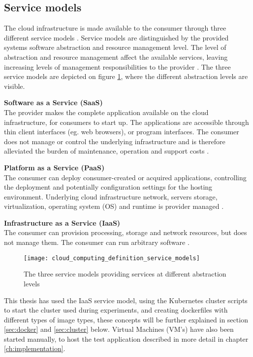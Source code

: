 \subsection{Service models}
The cloud infrastructure is made available to the consumer through three different service models \cite{mell2011nist}. Service models are distinguished by the provided systems software abstraction and resource management level. The level of abstraction and resource management affect the available services, leaving increasing levels of management responsibilities to the provider \cite[p. 52]{armbrust2010view}.
The three service models are depicted on figure \ref{fig:cloud_computing_definition_service_models}, where the different abstraction levels are visible.

\textbf{Software as a Service (SaaS)}\\
The provider makes the complete application available on the cloud infrastructure, for consumers to start up. The applications are accessible through thin client interfaces (eg. web browsers), or program interfaces. The consumer does not manage or control the underlying infrastructure and is therefore alleviated the burden of maintenance, operation and support costs \cite{youseff2008toward}.


\textbf{Platform as a Service (PaaS)}\\
The consumer can deploy consumer-created or acquired applications, controlling the deployment and potentially configuration settings for the hosting environment. Underlying cloud infrastructure network, servers storage, virtualization, operating system (OS) and runtime is provider managed \cite{youseff2008toward}.

\textbf{Infrastructure as a Service (IaaS)}\\
The consumer can provision processing, storage and network resources, but does not manage them. The consumer can run arbitrary software \cite{youseff2008toward}.

\begin{figure}[!htb]
  \texttt{[image: cloud\_computing\_definition\_service\_models]}  
  \caption{The three service models providing services at different abstraction levels}
  \label{fig:cloud_computing_definition_service_models}
\end{figure}

This thesis has used the IaaS service model, using the Kubernetes cluster scripts to start the cluster used during experiments, and creating dockerfiles with different types of image types, these concepts will be further explained in section \ref{sec:docker} and \ref{sec:cluster} below. Virtual Machines (VM's) have also been started manually, to host the test application described in more detail in chapter \ref{ch:implementation}.

